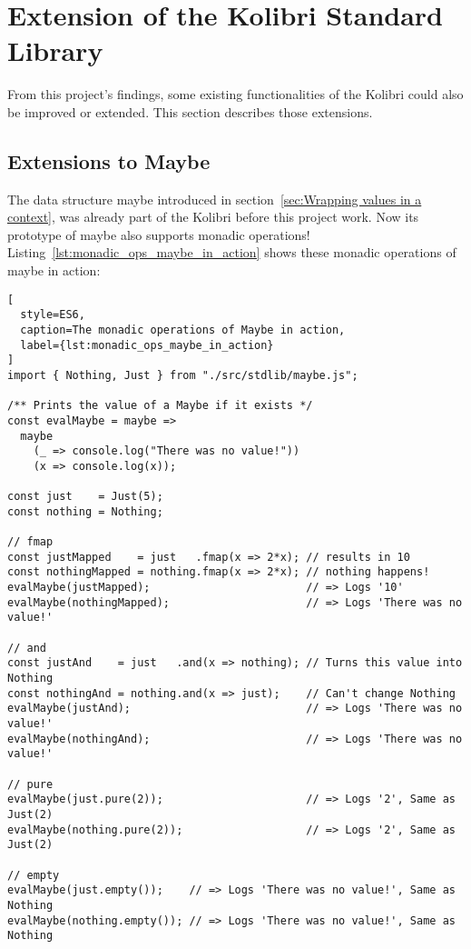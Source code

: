 \section{Extension of the Kolibri Standard Library}
\label{sec:Extension of the Kolibri Standard Library}
From this project's findings, some existing functionalities of the Kolibri
could also be improved or extended. This section describes those extensions.

\subsection{Extensions to Maybe} %
\label{sub:Extensions to Maybe}
The data structure maybe introduced in section~\ref{sec:Wrapping values in a
context}, was already part of the Kolibri before this project work. Now its
prototype of maybe also supports monadic operations!\\
Listing~\ref{lst:monadic_ops_maybe_in_action} shows these monadic operations of
maybe in action:

\begin{lstlisting}[
  style=ES6,
  caption=The monadic operations of Maybe in action,
  label={lst:monadic_ops_maybe_in_action}
]
import { Nothing, Just } from "./src/stdlib/maybe.js";

/** Prints the value of a Maybe if it exists */
const evalMaybe = maybe =>
  maybe
    (_ => console.log("There was no value!"))
    (x => console.log(x));

const just    = Just(5);
const nothing = Nothing;

// fmap 
const justMapped    = just   .fmap(x => 2*x); // results in 10
const nothingMapped = nothing.fmap(x => 2*x); // nothing happens!
evalMaybe(justMapped);                        // => Logs '10'
evalMaybe(nothingMapped);                     // => Logs 'There was no value!' 

// and
const justAnd    = just   .and(x => nothing); // Turns this value into Nothing
const nothingAnd = nothing.and(x => just);    // Can't change Nothing
evalMaybe(justAnd);                           // => Logs 'There was no value!'
evalMaybe(nothingAnd);                        // => Logs 'There was no value!' 

// pure
evalMaybe(just.pure(2));                      // => Logs '2', Same as Just(2)
evalMaybe(nothing.pure(2));                   // => Logs '2', Same as Just(2)

// empty
evalMaybe(just.empty());    // => Logs 'There was no value!', Same as Nothing
evalMaybe(nothing.empty()); // => Logs 'There was no value!', Same as Nothing
\end{lstlisting}

